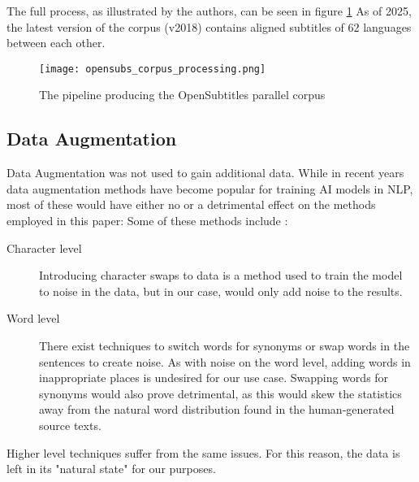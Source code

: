 The full process, as illustrated by the authors, can be seen in figure \ref{fig:opensubs pipeline}
As of 2025, the latest version of the corpus (v2018) contains aligned subtitles of 62 languages between each other.

\begin{figure}[H]
	\centering
    \texttt{[image: opensubs\_corpus\_processing.png]}
	\caption{The pipeline producing the OpenSubtitles parallel corpus}
    \label{fig:opensubs pipeline}
\end{figure}


\subsection{Data Augmentation}
Data Augmentation was not used to gain additional data.
While in recent years data augmentation methods have become popular for training AI models in NLP, most of these would have either no or a detrimental effect on the methods employed in this paper:
Some of these methods include \cite{pellicerDataAugmentationTechniques2023}:
\begin{description}
	\item[Character level]
	      Introducing character swaps to data is a method used to train the model to noise in the data, but in our case, would only add noise to the results.
	\item[Word level]
	      There exist techniques to switch words for synonyms or swap words in the sentences to create noise.
	      As with noise on the word level, adding words in inappropriate places is undesired for our use case.
	      Swapping words for synonyms would also prove detrimental, as this would skew the statistics away from the natural word distribution found in the human-generated source texts.
\end{description}
Higher level techniques suffer from the same issues.
For this reason, the data is left in its "natural state" for our purposes.



